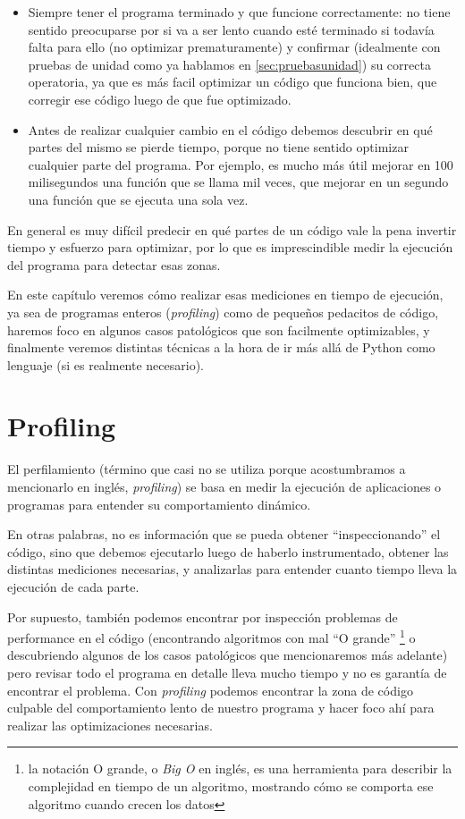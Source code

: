 \begin{itemize}
    \item Siempre tener el programa terminado y que funcione correctamente: no tiene sentido preocuparse por si va a ser lento cuando esté terminado si todavía falta para ello (no optimizar prematuramente) y confirmar (idealmente con pruebas de unidad como ya hablamos en \ref{sec:pruebasunidad}) su correcta operatoria, ya que es más facil optimizar un código que funciona bien, que corregir ese código luego de que fue optimizado.
    \item  Antes de realizar cualquier cambio en el código debemos descubrir en qué partes del mismo se pierde tiempo, porque no tiene sentido optimizar cualquier parte del programa. Por ejemplo, es mucho más útil mejorar en 100 milisegundos una función que se llama mil veces, que mejorar en un segundo una función que se ejecuta una sola vez.
\end{itemize}

En general es muy difícil predecir en qué partes de un código vale la pena invertir tiempo y esfuerzo para optimizar, por lo que es imprescindible medir la ejecución del programa para detectar esas zonas.

En este capítulo veremos cómo realizar esas mediciones en tiempo de ejecución, ya sea de programas enteros (\textit{profiling}) como de pequeños pedacitos de código, haremos foco en algunos casos patológicos que son facilmente optimizables, y finalmente veremos distintas técnicas a la hora de ir más allá de Python como lenguaje (si es realmente necesario).


\section{Profiling}

El perfilamiento (término que casi no se utiliza porque acostumbramos a mencionarlo en inglés, \textit{profiling}) se basa en medir la ejecución de aplicaciones o programas para entender su comportamiento dinámico. 

En otras palabras, no es información que se pueda obtener ``inspeccionando'' el código, sino que debemos ejecutarlo luego de haberlo instrumentado, obtener las distintas mediciones necesarias, y analizarlas para entender cuanto tiempo lleva la ejecución de cada parte.

Por supuesto, también podemos encontrar por inspección problemas de performance en el código (encontrando algoritmos con mal ``O grande'' \footnote{la notación O grande, o \textit{Big O} en inglés, es una herramienta para describir la complejidad en tiempo de un algoritmo, mostrando cómo se comporta ese algoritmo cuando crecen los datos} o descubriendo algunos de los casos patológicos que mencionaremos más adelante) pero revisar todo el programa en detalle lleva mucho tiempo y no es garantía de encontrar el problema. Con \textit{profiling} podemos encontrar la zona de código culpable del comportamiento lento de nuestro programa y hacer foco ahí para realizar las optimizaciones necesarias.

